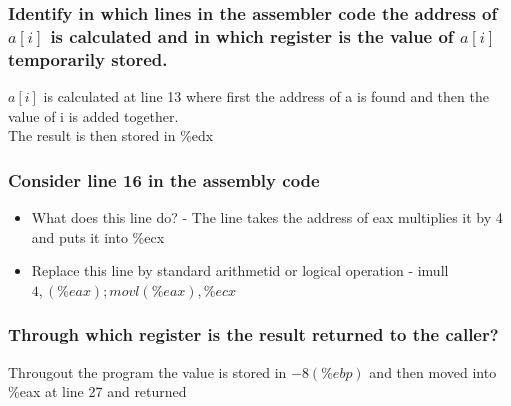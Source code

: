\documentclass[12pt, a4paper]{article}
\begin{document}
			\subsubsection{Identify in which lines in the assembler code the address of $a[i]$ is calculated and in which register is the value of $a[i]$ temporarily stored.}
				$a[i]$ is calculated at line 13 where first the address of a is found and then the value of i is added together.\\
				The result is then stored in \%edx
			\subsubsection{Consider line 16 in the assembly code}
				\begin{itemize}
					\item What does this line do? - The line takes the address of eax multiplies it by 4 and puts it into \%ecx
					\item Replace this line by standard arithmetid or logical operation - imull $4, (\%eax); movl (\%eax), \%ecx$
				\end{itemize}
			\subsubsection{Through which register is the result returned to the caller?}
				Througout the program the value is stored in $-8(\%ebp)$ and then moved into \%eax at line 27 and returned
				
			
\end{document}
